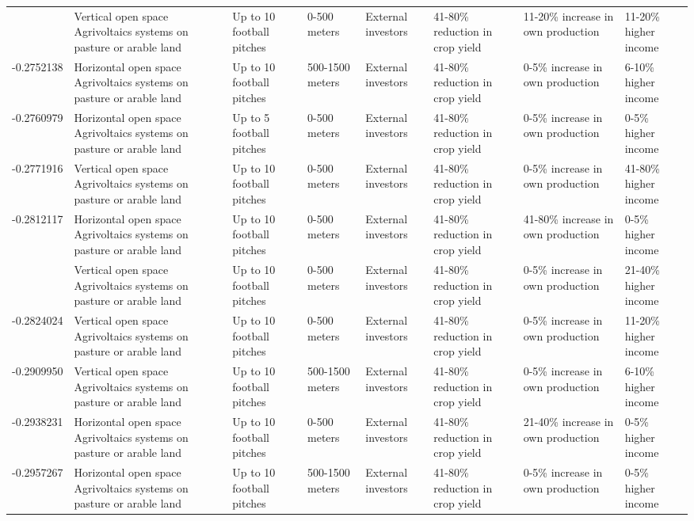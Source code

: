 \begin{table}
\begin{tabular}[t]{rlllllll}
\addlinespace
-0.2729023 & Vertical open space Agrivoltaics
systems on pasture or arable land & Up to 10 football pitches & 0-500 meters & External investors & 41-80\% reduction in crop yield & 11-20\% increase in own production & 11-20\% higher income\\
-0.2752138 & Horizontal open space Agrivoltaics
systems on pasture or arable land & Up to 10 football pitches & 500-1500 meters & External investors & 41-80\% reduction in crop yield & 0-5\% increase in own production & 6-10\% higher income\\
-0.2760979 & Horizontal open space Agrivoltaics
systems on pasture or arable land & Up to 5 football pitches & 0-500 meters & External investors & 41-80\% reduction in crop yield & 0-5\% increase in own production & 0-5\% higher income\\
-0.2771916 & Vertical open space Agrivoltaics
systems on pasture or arable land & Up to 10 football pitches & 0-500 meters & External investors & 41-80\% reduction in crop yield & 0-5\% increase in own production & 41-80\% higher income\\
-0.2812117 & Horizontal open space Agrivoltaics
systems on pasture or arable land & Up to 10 football pitches & 0-500 meters & External investors & 41-80\% reduction in crop yield & 41-80\% increase in own production & 0-5\% higher income\\
\addlinespace
-0.2824024 & Vertical open space Agrivoltaics
systems on pasture or arable land & Up to 10 football pitches & 0-500 meters & External investors & 41-80\% reduction in crop yield & 0-5\% increase in own production & 21-40\% higher income\\
-0.2824024 & Vertical open space Agrivoltaics
systems on pasture or arable land & Up to 10 football pitches & 0-500 meters & External investors & 41-80\% reduction in crop yield & 0-5\% increase in own production & 11-20\% higher income\\
-0.2909950 & Vertical open space Agrivoltaics
systems on pasture or arable land & Up to 10 football pitches & 500-1500 meters & External investors & 41-80\% reduction in crop yield & 0-5\% increase in own production & 6-10\% higher income\\
-0.2938231 & Horizontal open space Agrivoltaics
systems on pasture or arable land & Up to 10 football pitches & 0-500 meters & External investors & 41-80\% reduction in crop yield & 21-40\% increase in own production & 0-5\% higher income\\
-0.2957267 & Horizontal open space Agrivoltaics
systems on pasture or arable land & Up to 10 football pitches & 500-1500 meters & External investors & 41-80\% reduction in crop yield & 0-5\% increase in own production & 0-5\% higher income\\

\end{tabular}
\end{table}

